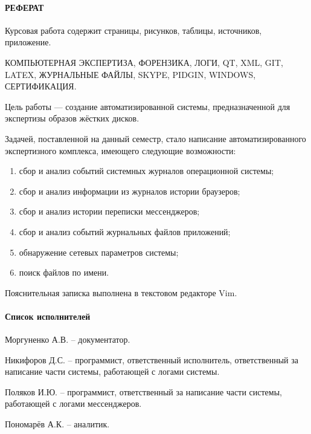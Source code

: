 \documentclass[russian,utf8,14pt,simple]{eskdtext}
\begin{document}
\newpage
{}
\paragraph{\hfill РЕФЕРАТ \hfill}
Курсовая работа содержит  страницы,  рисунков,  таблицы,  источников,  приложение.

КОМПЬЮТЕРНАЯ ЭКСПЕРТИЗА, ФОРЕНЗИКА, ЛОГИ, QT, XML, GIT, LATEX, ЖУРНАЛЬНЫЕ ФАЙЛЫ, SKYPE, PIDGIN, WINDOWS, СЕРТИФИКАЦИЯ.

Цель работы --- создание автоматизированной системы, предназначенной для экспертизы образов жёстких дисков.

Задачей, поставленной на данный семестр, стало написание автоматизированного экспертизного комплекса, имеющего следующие возможности: 

\begin{enumerate}
\item сбор и анализ событий системных журналов операционной системы;
\item сбор и анализ информации из журналов истории браузеров;
\item сбор и анализ истории переписки мессенджеров;
\item сбор и анализ событий журнальных файлов приложений;
\item обнаружение сетевых параметров системы;
\item поиск файлов по имени.
\end{enumerate}



Пояснительная записка выполнена в текстовом редакторе Vim.

\newpage
{}
\paragraph{\hfill Список исполнителей \hfill}
Моргуненко А.В. -- документатор.

Никифоров Д.С. -- программист, ответственный исполнитель, ответственный за написание части системы, работающей с логами системы.

Поляков И.Ю. -- программист, ответственный за написание части системы, работающей с логами мессенджеров.

Пономарёв А.К. -- аналитик.

\newpage
{}
\renewcommand\contentsname{\hfill Содержание \hfill}
\tableofcontents
\end{document}
